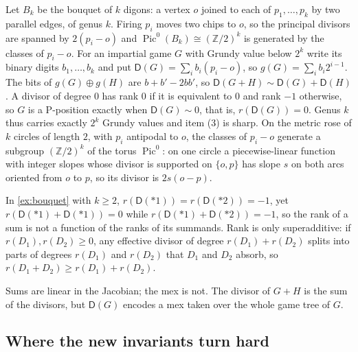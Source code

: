 \documentclass[final]{siamart0516}
\numberwithin{theorem}{section}
\numberwithin{equation}{section}
\theoremstyle{siamnonum}
\theoremstyle{plain}
\newcommand{\ZZ}{\mathbb{Z}}
\newcommand{\Dv}{\mathsf{D}}              %
\begin{document}
\begin{example}\label{ex:bouquet}
Let $B_k$ be the bouquet of $k$ digons: a vertex $o$ joined to each of $p_1,\dots,p_k$ by two parallel edges, of genus $k$. Firing $p_i$ moves two chips to $o$, so the principal divisors are spanned by $2(p_i-o)$ and $\operatorname{Pic}^0(B_k)\cong(\ZZ/2)^k$ is generated by the classes of $p_i-o$. For an impartial game $G$ with Grundy value below $2^k$ write its binary digits $b_1,\dots,b_k$ and put $\Dv(G)=\sum_ib_i(p_i-o)$, so $g(G)=\sum_ib_i2^{i-1}$. The bits of $g(G)\oplus g(H)$ are $b+b'-2bb'$, so $\Dv(G+H)\sim\Dv(G)+\Dv(H)$. A divisor of degree $0$ has rank $0$ if it is equivalent to $0$ and rank $-1$ otherwise, so $G$ is a P-position exactly when $\Dv(G)\sim0$, that is, $r(\Dv(G))=0$. Genus $k$ thus carries exactly $2^k$ Grundy values and item (3) is sharp. On the metric rose of $k$ circles of length $2$, with $p_i$ antipodal to $o$, the classes of $p_i-o$ generate a subgroup $(\ZZ/2)^k$ of the torus $\operatorname{Pic}^0$: on one circle a piecewise-linear function with integer slopes whose divisor is supported on $\{o,p\}$ has slope $s$ on both arcs oriented from $o$ to $p$, so its divisor is $2s(o-p)$.
\end{example}

\begin{corollary}\label{cor:rank-not}
In \cref{ex:bouquet} with $k\ge2$, $r(\Dv(*1))=r(\Dv(*2))=-1$, yet $r(\Dv(*1)+\Dv(*1))=0$ while $r(\Dv(*1)+\Dv(*2))=-1$, so the rank of a sum is not a function of the ranks of its summands. Rank is only superadditive: if $r(D_1),r(D_2)\ge0$, any effective divisor of degree $r(D_1)+r(D_2)$ splits into parts of degrees $r(D_1)$ and $r(D_2)$ that $D_1$ and $D_2$ absorb, so $r(D_1+D_2)\ge r(D_1)+r(D_2)$.
\end{corollary}

Sums are linear in the Jacobian; the mex is not. The divisor of $G+H$ is the sum of the divisors, but $\Dv(G)$ encodes a mex taken over the whole game tree of $G$.

\subsection{Where the new invariants turn hard}\label{ssec:hard}
\end{document}

